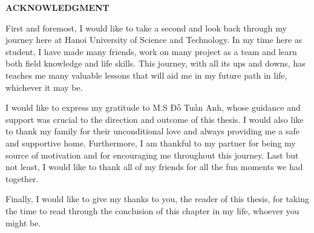 \begin{center}
  \Large{\textbf{ACKNOWLEDGMENT}}\\
\end{center}
\vspace{1cm}

First and foremost, I would like to take a second and look back through my journey here at Hanoi University of Science and Technology. In my time here as student, I have made many friends, work on many project as a team and learn both field knowledge and life skills. This journey, with all its ups and downs, has teaches me many valuable lessons that will aid me in my future path in life, whichever it may be.

I would like to express my gratitude to M.S Đỗ Tuấn Anh, whose guidance and support was crucial to the direction and outcome of this thesis. I would also like to thank my family for their unconditional love and always providing me a safe and supportive home. Furthermore, I am thankful to my partner for being my source of motivation and for encouraging me throughout this journey. Last but not least, I would like to thank all of my friends for all the fun moments we had together.

Finally, I would like to give my thanks to you, the reader of this thesis, for taking the time to read through the conclusion of this chapter in my life, whoever you might be.
